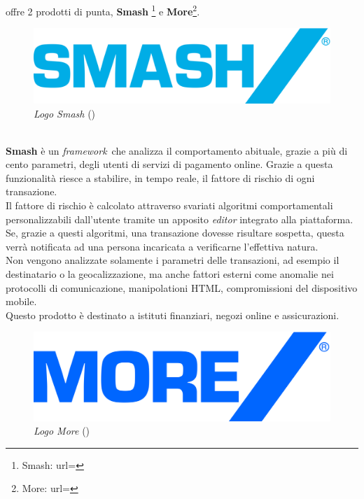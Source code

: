 \textit{\azienda} offre 2 prodotti di punta, \textbf{Smash\textregistered} \footnote{Smash: url= } e \textbf{More\textregistered}\footnote{More: url= }.\\
\begin{figure}[h!]
	\centering
	\includegraphics[scale=0.1]{immagini/smash.png}
	\caption{\textit{Logo Smash\textregistered} ()}
\end{figure}
\\
\textbf{Smash\textregistered} è un \emph{framework}\glsfirstoccur\ che analizza il comportamento abituale, grazie a più di cento parametri, degli utenti di servizi di pagamento online. Grazie a questa funzionalità riesce a stabilire, in tempo reale, il fattore di rischio di ogni transazione.\\
Il fattore di rischio è calcolato attraverso svariati algoritmi comportamentali personalizzabili dall'utente tramite un apposito \textit{editor} integrato alla piattaforma. Se, grazie a questi algoritmi, una transazione dovesse risultare sospetta, questa verrà notificata ad una persona incaricata a verificarne l'effettiva natura.\\
Non vengono analizzate solamente i parametri delle transazioni, ad esempio il destinatario o la geocalizzazione, ma anche fattori esterni come anomalie nei protocolli di comunicazione, manipolationi HTML, compromissioni del dispositivo mobile.\\
Questo prodotto è destinato a istituti finanziari, negozi online e assicurazioni.\\
\begin{figure}[h!]
	\centering
	\includegraphics[scale=0.1]{immagini/more.png}
	\caption{\textit{Logo More\textregistered} ()}
\end{figure}
